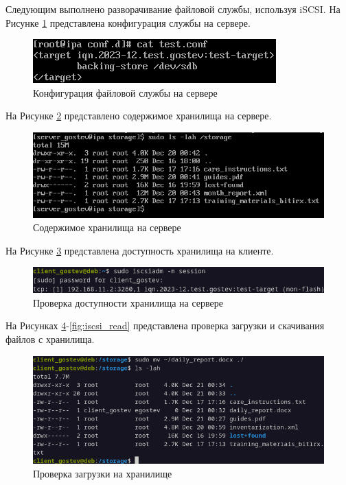 \documentclass[14pt, a4paper]{extarticle}
\numberwithin{equation}{section}
\begin{document}
Следующим выполнено разворачивание файловой службы, используя iSCSI. 
На Рисунке \ref{fig:iscsi_server_cfg} представлена конфигурация службы на сервере.
\begin{figure}[H]
        \centering
        \includegraphics[scale=1.2]{services/iscsi/server_cfg.png}
        \caption{Конфигурация файловой службы на сервере}
        \label{fig:iscsi_server_cfg}
\end{figure}

На Рисунке \ref{fig:iscsi_server_file_content} представлено содержимое хранилища на сервере.
\begin{figure}[H]
        \centering
        \includegraphics[scale=1.3]{services/iscsi/server_file_content.png}
        \caption{Содержимое хранилища на сервере}
        \label{fig:iscsi_server_file_content}
\end{figure}

На Рисунке \ref{fig:iscsi_connect} представлена доступность хранилища на клиенте.
\begin{figure}[H]
        \centering
        \includegraphics[scale=1]{services/iscsi/connect.png}
        \caption{Проверка доступности хранилища на сервере}
        \label{fig:iscsi_connect}
\end{figure}

На Рисунках \ref{fig:iscsi_write}-\ref{fig:iscsi_read} представлена проверка загрузки и скачивания файлов с хранилища.
\begin{figure}[H]
        \centering
        \includegraphics[scale=0.9]{services/iscsi/write.png}
        \caption{Проверка загрузки на хранилище}
        \label{fig:iscsi_write}
\end{figure}
\end{document}
